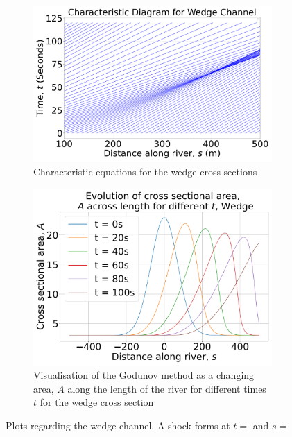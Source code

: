 \documentclass[12pt]{article}
\begin{document}
\begin{figure}[H]
    \centering
    \begin{subfigure}[b]{0.49\textwidth}
        \centering
        \includegraphics[width=\textwidth]{Figures/Wedge_characteristic.pdf}
        \caption{Characteristic equations for the wedge cross sections}
        \label{fig:wedge_char}
    \end{subfigure}
    \hfill
    \begin{subfigure}[b]{0.49\textwidth}
        \centering
        \includegraphics[width=\textwidth]{Figures/Wedge_godunov.pdf}
        \caption{Visualisation of the Godunov method as a changing area, $A$ along the length of the river for different times $t$ for the wedge cross section}
        \label{fig:wedge_godunov}
    \end{subfigure}
    \caption{Plots regarding the wedge channel. A shock forms at $t = $ and $s = $}
\end{figure}
\end{document}
